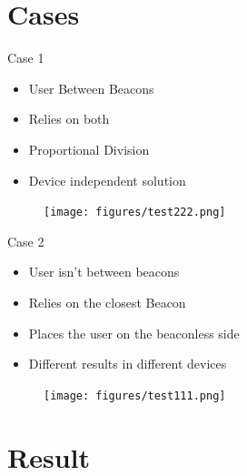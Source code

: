 \documentclass{beamer}
\begin{document}
\section{Cases}
\begin{frame}[fragile]{Case 1}
	\begin{minipage}{0.49\textwidth}
		\begin{itemize}
			\item User Between Beacons
			\item Relies on both
			\item Proportional Division
			\item Device independent solution
		\end{itemize}
	\end{minipage}
	\begin{minipage}{0.49\textwidth}
		\begin{figure}
			\texttt{[image: figures/test222.png]}
		\end{figure}
	\end{minipage}
\end{frame}
\begin{frame}[fragile]{Case 2}
\begin{minipage}{0.49\textwidth}
\begin{itemize}
	\item User isn't between beacons
	\item Relies on the closest Beacon
	\item Places the user on the beaconless side
	\item Different results in different devices
\end{itemize}
\end{minipage}
\begin{minipage}{0.49\textwidth}
\begin{figure}
	\texttt{[image: figures/test111.png]}
\end{figure}
\end{minipage}
\end{frame}



\section{Result}
\end{document}
